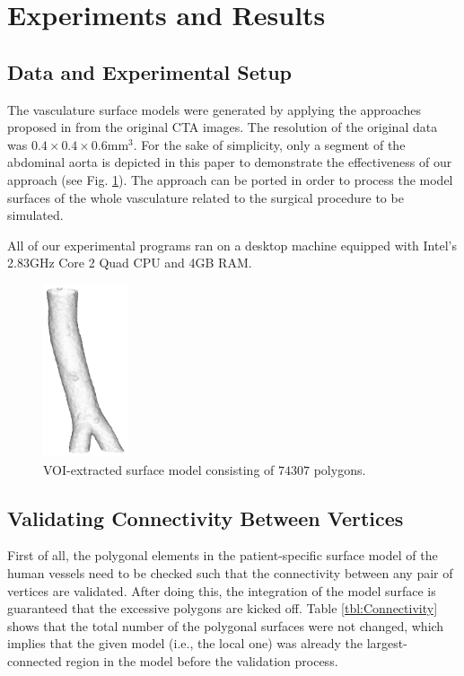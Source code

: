 \section{Experiments and Results}
\label{sec6_2}

\subsection{Data and Experimental Setup}

The vasculature surface models were generated by applying the approaches proposed in \cite{Yang2014ICRA} from the original CTA images.
The resolution of the original data was $0.4 \times 0.4 \times 0.6 \text{mm}^3$.
For the sake of simplicity, only a segment of the abdominal aorta is depicted in this paper to demonstrate the effectiveness of our approach (see Fig. \ref{fig:VOI}).
The approach can be ported in order to process the model surfaces of the whole vasculature related to the surgical procedure to be simulated.

All of our experimental programs ran on a desktop machine equipped with Intel's 2.83GHz Core 2 Quad CPU and 4GB RAM.

\begin{figure}[t]
\centering
\includegraphics[height=2.0in]{Figures/chap06/original.png}
\caption{VOI-extracted surface model consisting of $74307$ polygons.}
\label{fig:VOI}
\end{figure}

\subsection{Validating Connectivity Between Vertices}

First of all, the polygonal elements in the patient-specific surface model of the human vessels need to be checked such that the connectivity between any pair of vertices are validated. %
After doing this, the integration of the model surface is guaranteed that the excessive polygons are kicked off.
Table \ref{tbl:Connectivity} shows that the total number of the polygonal surfaces were not changed, which implies that the given model (i.e., the local one) was already the largest-connected region in the model before the validation process. %

